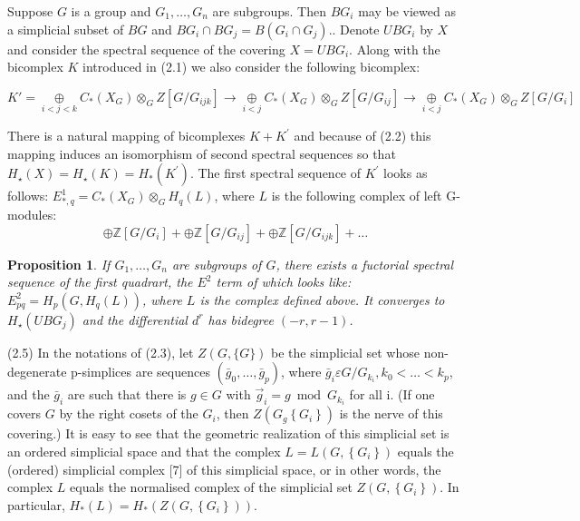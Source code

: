\documentclass{book}
\newtheorem{prop}{Proposition}
\begin{document}
Suppose $G$ is a group and $G_1, \ldots, G_n$ are subgroups. Then $B G_i$ may be viewed as a simplicial subset of $B G$ and $B G_i \cap B G_j=B\left(G_i \cap G_j\right)$.. Denote $U B G_i$ by $X$ and consider the spectral sequence of the covering $X=U B G_i$. Along with the bicomplex $K$ introduced in (2.1) we also consider the following bicomplex:

$$K' = \underset{i<j<k}{\oplus} C_*\left(X_G\right) \otimes_G Z\left[G / G_{i j k}\right] \longrightarrow \underset{i<j}{\oplus} C_*\left(X_G\right) \otimes_G Z\left[G / G_{i j}\right] \longrightarrow \underset{i<j}{\oplus} C_*\left(X_G\right) \otimes_G Z\left[G / G_{i}\right] $$

There is a natural mapping of bicomplexes $K+K^{\prime}$ and because of (2.2) this mapping induces an isomorphism of second spectral sequences so that $H_{\star}(X)=H_{\star}(K)=H_*\left(K^{\prime}\right)$. The first spectral sequence of $K^{\prime}$ looks as follows: $E_{*, q}^1=C_*\left(X_G\right) \otimes_G H_q(L)$, where $L$ is the following complex of left G-modules:
$$
\oplus \mathbb{Z}\left[G / G_i\right]+\oplus \mathbb{Z}\left[G / G_{i j}\right]+\oplus \mathbb{Z}\left[G / G_{i j k}\right]+\ldots
$$


\begin{prop}
If $G_1, \ldots, G_n$ are subgroups of $G$, there exists a fuctorial spectral sequence of the first quadrart, the $E^2$ term of which looks like: $E_{p q}^2=H_p\left(G, H_q(L)\right)$, where $L$ is the complex defined above. It converges to $H_{\star}\left(U B G_j\right)$ and the differential $d^r$ has bidegree $(-r, r-1)$.   
\end{prop}

(2.5) In the notations of (2.3), let $Z(G,\{G\})$ be the simplicial set whose non-degenerate p-simplices are sequences $\left(\bar{g}_0, \ldots, \bar{g}_p\right)$, where $\bar{g}_i \varepsilon G / G_{k_i}, k_0<\ldots<k_p$, and the $\bar{g}_i$ are such that there is $g \in G$ with $\vec{g}_i=g \bmod G_{k_i}$ for all i. (If one covers $G$ by the right cosets of the $G_i$, then $Z\left(G_g\left\{G_i\right\}\right)$ is the nerve of this covering.) It is easy to see that the geometric realization of this simplicial set is an ordered simplicial space and that the complex $L=L\left(G,\left\{G_i\right\}\right)$ equals the (ordered) simplicial complex [7] of this simplicial space, or in other words, the complex $L$ equals the normalised complex of the simplicial set $Z\left(G,\left\{G_i\right\}\right)$. In particular, $H_*(L)=H_*\left(Z\left(G,\left\{G_i\right\}\right)\right)$.
\end{document}
